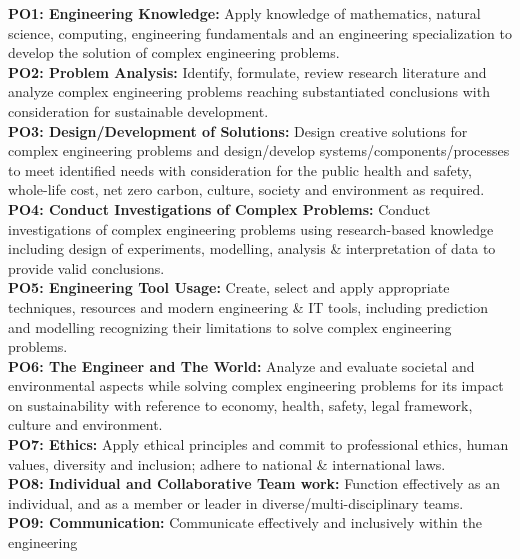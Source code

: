 \begin{tcolorbox}[ enhanced, left=2mm, right=2mm, width=14cm, attach boxed title to top center={yshift=-3mm,yshifttext=-1mm}, 
	valign=center,
	colback=gray!5!white,colframe=black!75!black,colbacktitle=gray!90!black,
	title=\large Program Outcomes (POs), fonttitle=\bfseries,
	boxed title style={size=small,colframe=gray!90!black} ]
	{\scriptsize
	
	\textbf{PO1: Engineering Knowledge:} Apply knowledge of mathematics, natural science,
	computing, engineering fundamentals and an engineering specialization  to develop  the solution of complex engineering problems.\\
	\textbf{PO2: Problem Analysis:} Identify, formulate, review research literature and analyze
	complex engineering problems reaching substantiated conclusions with consideration
	for sustainable development.\\
	\textbf{PO3: Design/Development of Solutions:} Design creative solutions for complex
	engineering problems and design/develop systems/components/processes to meet
	identified needs with consideration for the public health and safety, whole-life cost,
	net zero carbon, culture, society and environment as required.\\
	\textbf{PO4: Conduct Investigations of Complex Problems:} Conduct investigations of complex
	engineering problems using research-based knowledge including design of
	experiments, modelling, analysis \& interpretation of data to provide valid conclusions.\\
	\textbf{PO5: Engineering Tool Usage:} Create, select and apply appropriate techniques, resources
	and modern engineering \& IT tools, including prediction and modelling recognizing
	their limitations to solve complex engineering problems. \\
	\textbf{PO6: The Engineer and The World:} Analyze and evaluate societal and environmental
	aspects while solving complex engineering problems for its impact on sustainability
	with reference to economy, health, safety, legal framework, culture and environment.\\
	\textbf{PO7: Ethics: }Apply ethical principles and commit to professional ethics, human values,
	diversity and inclusion; adhere to national \& international laws.\\
	\textbf{PO8: Individual and Collaborative Team work:} Function effectively as an individual, and
	as a member or leader in diverse/multi-disciplinary teams.\\
	\textbf{PO9: Communication:} Communicate effectively and inclusively within the engineering
}
\end{tcolorbox}
